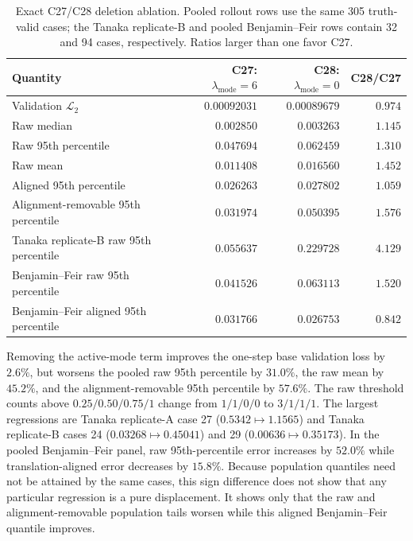 \begin{table}[t]
  \centering
  \small
  \caption{Exact C27/C28 deletion ablation. Pooled rollout rows use the same
  305 truth-valid cases; the Tanaka replicate-B and pooled Benjamin--Feir rows contain
  32 and 94 cases, respectively. Ratios larger than one favor C27.}
  \label{tab:mode-ablation}
  \begin{tabular}{lrrr}
    \toprule
    Quantity & C27: $\lambda_{\mathrm{mode}}=6$
             & C28: $\lambda_{\mathrm{mode}}=0$ & C28/C27\\
    \midrule
    Validation $\mathcal L_2$       & $0.00092031$ & $0.00089679$ & $0.974$\\
    Raw median                       & $0.002850$   & $0.003263$   & $1.145$\\
    Raw 95th percentile              & $0.047694$   & $0.062459$   & $1.310$\\
    Raw mean                         & $0.011408$   & $0.016560$   & $1.452$\\
    Aligned 95th percentile          & $0.026263$   & $0.027802$   & $1.059$\\
    Alignment-removable 95th percentile
                                      & $0.031974$   & $0.050395$   & $1.576$\\
    Tanaka replicate-B raw 95th percentile
                                      & $0.055637$   & $0.229728$   & $4.129$\\
    Benjamin--Feir raw 95th percentile
                                      & $0.041526$   & $0.063113$   & $1.520$\\
    Benjamin--Feir aligned 95th percentile
                                      & $0.031766$   & $0.026753$   & $0.842$\\
    \bottomrule
  \end{tabular}
\end{table}

Removing the active-mode term improves the one-step base validation loss by
$2.6\%$, but worsens the pooled raw 95th percentile by $31.0\%$, the raw mean
by $45.2\%$, and the alignment-removable 95th percentile by $57.6\%$.  The
raw threshold counts above $0.25/0.50/0.75/1$ change from $1/1/0/0$ to
$3/1/1/1$.  The largest regressions are Tanaka replicate-A case 27
($0.5342\mapsto1.1565$) and Tanaka replicate-B cases 24
($0.03268\mapsto0.45041$) and 29 ($0.00636\mapsto0.35173$).  In the pooled
Benjamin--Feir panel, raw 95th-percentile error increases by $52.0\%$ while
translation-aligned error decreases by $15.8\%$. Because population quantiles
need not be attained by the same cases, this sign difference does not show
that any particular regression is a pure displacement.  It shows only that
the raw and alignment-removable population tails worsen while this aligned
Benjamin--Feir quantile improves.

